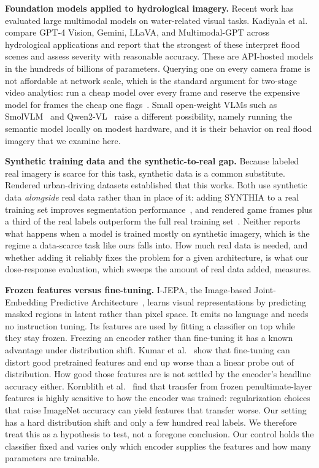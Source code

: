 \documentclass[conference]{IEEEtran}
\begin{document}
\textbf{Foundation models applied to hydrological imagery.} Recent work has evaluated large multimodal models on water-related visual tasks. Kadiyala et al.~\cite{kadiyala2024mllm} compare GPT-4 Vision, Gemini, LLaVA, and Multimodal-GPT across hydrological applications and report that the strongest of these interpret flood scenes and assess severity with reasonable accuracy. These are API-hosted models in the hundreds of billions of parameters. Querying one on every camera frame is not affordable at network scale, which is the standard argument for two-stage video analytics: run a cheap model over every frame and reserve the expensive model for frames the cheap one flags~\cite{kang2017noscope}. Small open-weight VLMs such as SmolVLM~\cite{marafioti2025smolvlm} and Qwen2-VL~\cite{wang2024qwen2vl} raise a different possibility, namely running the semantic model locally on modest hardware, and it is their behavior on real flood imagery that we examine here.

\textbf{Synthetic training data and the synthetic-to-real gap.} Because labeled real imagery is scarce for this task, synthetic data is a common substitute. Rendered urban-driving datasets established that this works. Both use synthetic data \emph{alongside} real data rather than in place of it: adding SYNTHIA to a real training set improves segmentation performance~\cite{ros2016synthia}, and rendered game frames plus a third of the real labels outperform the full real training set~\cite{richter2016playing}. Neither reports what happens when a model is trained mostly on synthetic imagery, which is the regime a data-scarce task like ours falls into. How much real data is needed, and whether adding it reliably fixes the problem for a given architecture, is what our dose-response evaluation, which sweeps the amount of real data added, measures.

\textbf{Frozen features versus fine-tuning.} I-JEPA, the Image-based Joint-Embedding Predictive Architecture~\cite{assran2023ijepa}, learns visual representations by predicting masked regions in latent rather than pixel space. It emits no language and needs no instruction tuning. Its features are used by fitting a classifier on top while they stay frozen. Freezing an encoder rather than fine-tuning it has a known advantage under distribution shift. Kumar et al.~\cite{kumar2022finetuning} show that fine-tuning can distort good pretrained features and end up worse than a linear probe out of distribution. How good those features are is not settled by the encoder's headline accuracy either. Kornblith et al.~\cite{kornblith2019better} find that transfer from frozen penultimate-layer features is highly sensitive to how the encoder was trained: regularization choices that raise ImageNet accuracy can yield features that transfer worse. Our setting has a hard distribution shift and only a few hundred real labels. We therefore treat this as a hypothesis to test, not a foregone conclusion. Our control holds the classifier fixed and varies only which encoder supplies the features and how many parameters are trainable.
\end{document}
